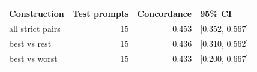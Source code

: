 \begin{tabular}{lrrl}
\toprule
Construction & Test prompts & Concordance & 95\% CI \\
\midrule
all strict pairs & 15 & 0.453 & [0.352, 0.567] \\
best vs rest & 15 & 0.436 & [0.310, 0.562] \\
best vs worst & 15 & 0.433 & [0.200, 0.667] \\
\bottomrule
\end{tabular}
